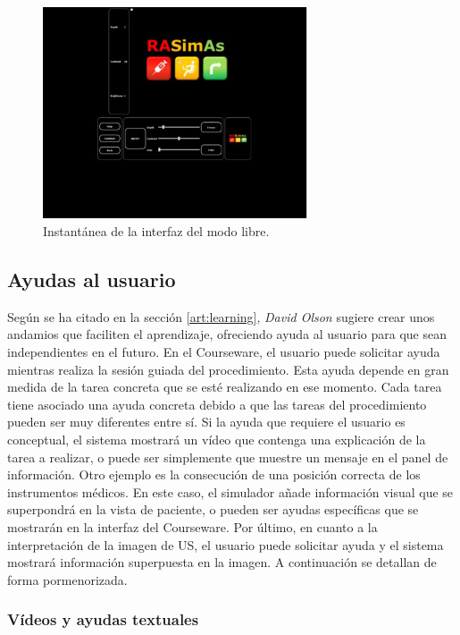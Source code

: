 \begin{figure}[hb]
    \centering
    \includegraphics[width=0.7\textwidth]{IMG/freeui.PNG}
    \caption{Instantánea de la interfaz del modo libre.}
    \label{fig:freeui}
\end{figure}


 

\subsection{Ayudas al usuario}
\label{course:ayudas}

Según se ha citado en la sección \ref{art:learning}, \emph{David Olson} \cite{olson2014jerome} sugiere crear unos andamios que faciliten el aprendizaje, ofreciendo ayuda al usuario para que sean independientes en el futuro. En el \ac{Courseware}, el usuario puede solicitar ayuda mientras realiza la sesión guiada del procedimiento. Esta ayuda depende en gran medida de la tarea concreta que se esté realizando en ese momento. Cada tarea tiene asociado una ayuda concreta debido a que las tareas del procedimiento pueden ser muy diferentes entre sí. Si la ayuda que requiere el usuario es conceptual, el sistema mostrará un vídeo que contenga una explicación de la tarea a realizar, o puede ser simplemente que muestre un mensaje en el panel de información. Otro ejemplo es la consecución de una posición correcta de los instrumentos médicos. En este caso, el simulador añade información visual que se superpondrá en la vista de paciente, o pueden ser ayudas específicas que se mostrarán en la interfaz del \ac{Courseware}. Por último, en cuanto a la interpretación de la imagen de \ac{US}, el usuario puede solicitar ayuda y el sistema mostrará información superpuesta en la imagen. A continuación se detallan de forma pormenorizada.


\subsubsection{Vídeos y ayudas textuales}

